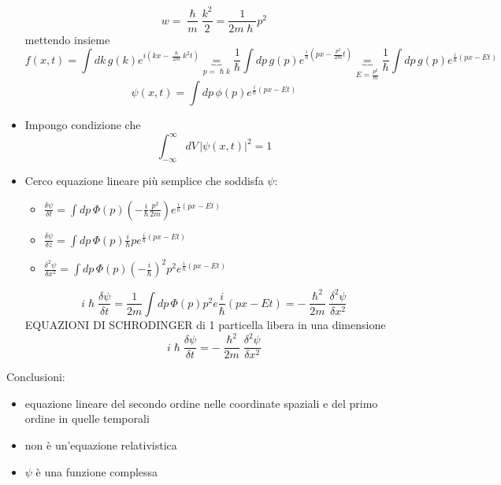 \begin{itemize}
\begin{equation*}
        w = \frac{\hslash}{m}\frac{k^2}{2} = \frac{1}{2m\hslash}p^2
    \end{equation*}
    mettendo insieme
    \begin{equation*}
        f(x,t) = \int dk \, g(k) e^{i\left(kx - \frac{\hslash}{2m}k^2t\right)}\underbrace{=}_{p=\hslash k} \frac{1}{\hslash}\int dp \, g(p)e^{\frac{i}{\hslash}\left(px - \frac{p^2}{2m}t\right)} \underbrace{=}_{E=\frac{p^2}{m}} \frac{1}{\hslash}\int dp \, g(p)e^{\frac{i}{\hslash}(px - Et)}
    \end{equation*}
    \begin{equation*}
        \psi (x,t) = \int dp \, \phi(p) e^{\frac{i}{\hslash}(px - Et)}
    \end{equation*}
    \item Impongo condizione che 
    \begin{equation*}
        \int_{-\infty}^\infty dV \, {|\psi(x,t)|}^2 = 1 
    \end{equation*}
    \item Cerco equazione lineare più semplice che soddisfa $\psi$:
    \begin{itemize}
        \item $\frac{\delta \psi}{\delta t} = \int dp \, \Phi (p) \left(-\frac{i}{\hslash}\frac{p^2}{2m}\right)e^{\frac{i}{\hslash}(px-Et)}$
        \item  $\frac{\delta \psi}{\delta z} = \int dp \, \Phi (p) \frac{i}{\hslash}p e^{\frac{i}{\hslash}(px-Et)}$
        \item $\frac{\delta^2 \psi}{\delta x^2} = \int dp \, \Phi (p) {\left(-\frac{i}{\hslash}\right)}^2p^2 e^{\frac{i}{\hslash}(px-Et)}$
    \end{itemize}
    \begin{equation*}
        i\hslash \frac{\delta \psi}{\delta t} = \frac{1}{2m} \int dp \, \Phi (p) p^2 e{\frac{i}{\hslash}(px-Et)} = -\frac{\hslash^2}{2m} \frac{\delta^2 \psi}{\delta x^2}
    \end{equation*}
    EQUAZIONI DI SCHRODINGER di 1 particella libera in una dimensione 
    \begin{equation}
        i\hslash \frac{\delta \psi}{\delta t} = -\frac{\hslash^2}{2m} \frac{\delta^2 \psi}{\delta x^2}
    \end{equation}
\end{itemize}
Conclusioni:
\begin{itemize}
    \item equazione lineare del secondo ordine nelle coordinate spaziali e del primo ordine in quelle temporali
    \item non è un'equazione relativistica
    \item $\psi$ è una funzione complessa
\end{itemize}
